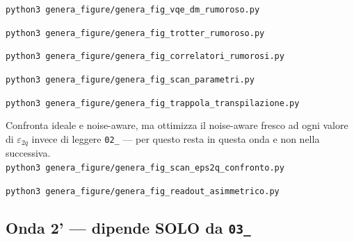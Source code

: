 \documentclass[11pt,a4paper]{article}
\newcommand{\code}[1]{\texttt{\small #1}}
\begin{document}
\begin{keyeq}[title={genera\_fig\_vqe\_dm\_rumoroso.py $\to$ fig\_passo2\_scan\_eps2q}]
\code{python3 genera\_figure/genera\_fig\_vqe\_dm\_rumoroso.py}
\end{keyeq}

\begin{keyeq}[title={genera\_fig\_trotter\_rumoroso.py $\to$ fig\_passo3\_F\_vs\_N, fig\_passo3\_zoom\_minimo}]
\code{python3 genera\_figure/genera\_fig\_trotter\_rumoroso.py}
\end{keyeq}

\begin{keyeq}[title={genera\_fig\_correlatori\_rumorosi.py $\to$ fig\_passo4\_correlatore\_vs\_N}]
\code{python3 genera\_figure/genera\_fig\_correlatori\_rumorosi.py}
\end{keyeq}

\begin{keyeq}[title={genera\_fig\_scan\_parametri.py $\to$ fig\_passo5\_Nstar\_vs\_eps}]
\code{python3 genera\_figure/genera\_fig\_scan\_parametri.py}
\end{keyeq}

\begin{keyeq}[title={genera\_fig\_trappola\_transpilazione.py $\to$ fig\_bug\_conteggio\_gate}]
\code{python3 genera\_figure/genera\_fig\_trappola\_transpilazione.py}
\end{keyeq}

\begin{keyeq}[title={genera\_fig\_scan\_eps2q\_confronto.py $\to$ fig\_scan\_eps2q\_confronto}]
Confronta ideale e noise-aware, ma ottimizza il noise-aware fresco ad
ogni valore di $\varepsilon_{2q}$ invece di leggere \code{02\_} --- per
questo resta in questa onda e non nella successiva.\\
\code{python3 genera\_figure/genera\_fig\_scan\_eps2q\_confronto.py}
\end{keyeq}

\begin{keyeq}[title={genera\_fig\_readout\_asimmetrico.py $\to$ fig\_correlatore\_N\_asimmetrico, fig\_Nstar\_vs\_rapporto}]
\code{python3 genera\_figure/genera\_fig\_readout\_asimmetrico.py}
\end{keyeq}

\subsection{Onda 2' --- dipende SOLO da \texorpdfstring{\code{03\_}}{03\_}}
\end{document}
